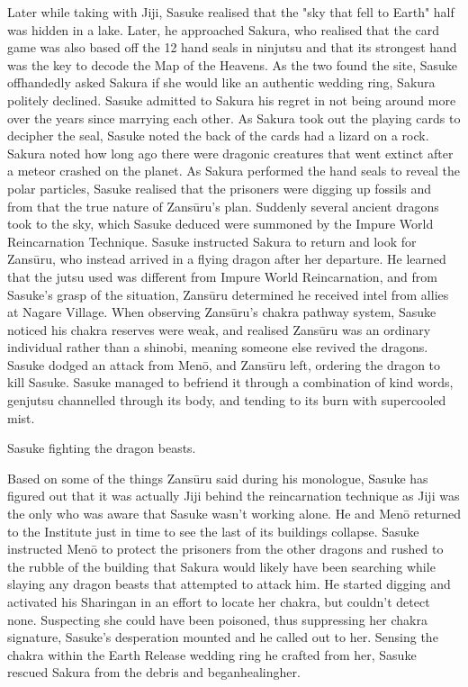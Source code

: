 \documentclass[a4paper,12pt]{article}
\begin{document}
Later while taking with Jiji, Sasuke realised that the "sky that fell to Earth" half was hidden in a lake. Later, he approached Sakura, who realised that the card game was also based off the 12 hand seals in ninjutsu and that its strongest hand was the key to decode the Map of the Heavens. As the two found the site, Sasuke offhandedly asked Sakura if she would like an authentic wedding ring, Sakura politely declined. Sasuke admitted to Sakura his regret in not being around more over the years since marrying each other. As Sakura took out the playing cards to decipher the seal, Sasuke noted the back of the cards had a lizard on a rock. Sakura noted how long ago there were dragonic creatures that went extinct after a meteor crashed on the planet. As Sakura performed the hand seals to reveal the polar particles, Sasuke realised that the prisoners were digging up fossils and from that the true nature of Zansūru's plan. Suddenly several ancient dragons took to the sky, which Sasuke deduced were summoned by the Impure World Reincarnation Technique. Sasuke instructed Sakura to return and look for Zansūru, who instead arrived in a flying dragon after her departure. He learned that the jutsu used was different from Impure World Reincarnation, and from Sasuke's grasp of the situation, Zansūru determined he received intel from allies at Nagare Village. When observing Zansūru's chakra pathway system, Sasuke noticed his chakra reserves were weak, and realised Zansūru was an ordinary individual rather than a shinobi, meaning someone else revived the dragons. Sasuke dodged an attack from Menō, and Zansūru left, ordering the dragon to kill Sasuke. Sasuke managed to befriend it through a combination of kind words, genjutsu channelled through its body, and tending to its burn with supercooled mist.\\ \par \vspace{0.5cm}

Sasuke fighting the dragon beasts.\\ \par \vspace{0.5cm}

Based on some of the things Zansūru said during his monologue, Sasuke has figured out that it was actually Jiji behind the reincarnation technique as Jiji was the only who was aware that Sasuke wasn't working alone. He and Menō returned to the Institute just in time to see the last of its buildings collapse. Sasuke instructed Menō to protect the prisoners from the other dragons and rushed to the rubble of the building that Sakura would likely have been searching while slaying any dragon beasts that attempted to attack him. He started digging and activated his Sharingan in an effort to locate her chakra, but couldn't detect none. Suspecting she could have been poisoned, thus suppressing her chakra signature, Sasuke's desperation mounted and he called out to her. Sensing the chakra within the Earth Release wedding ring he crafted from her, Sasuke rescued Sakura from the debris and beganhealingher.\\ \par \vspace{0.5cm}
\end{document}
